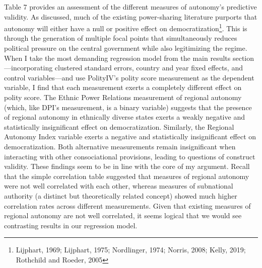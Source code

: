 \documentclass[12pt]{article}
\begin{document}
Table 7 provides an assessment of the different measures of autonomy's predictive validity. As discussed, much of the existing power-sharing literature purports that autonomy will either have a null or positive effect on democratization\footnote{Lijphart, 1969; Lijphart, 1975; Nordlinger, 1974; Norris, 2008; Kelly, 2019; Rothchild and Roeder, 2005}. This is through the generation of multiple focal points that simultaneously reduces political pressure on the central government while also legitimizing the regime. When I take the most demanding regression model from the main results section---incorporating clustered standard errors, country and year fixed effects, and control variables---and use PolityIV's polity score measurement as the dependent variable, I find that each measurement exerts a completely different effect on polity score. The Ethnic Power Relations measurement of regional autonomy (which, like DPI's measurement, is a binary variable) suggests that the presence of regional autonomy in ethnically diverse states exerts a weakly negative and statistically insignificant effect on democratization. Similarly, the Regional Autonomy Index variable exerts a negative and statistically insignificant effect on democratization. Both alternative measurements remain insignificant when interacting with other consociational provisions, leading to questions of construct validity. These findings seem to be in line with the core of my argument. Recall that the simple correlation table suggested that measures of regional autonomy were not well correlated with each other, whereas measures of subnational authority (a distinct but theoretically related concept) showed much higher correlation rates across different measurements. Given that existing measures of regional autonomy are not well correlated, it seems logical that we would see contrasting results in our regression model.
\end{document}
